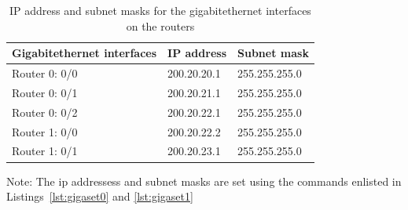 \documentclass{lab_sheet}
\newcommand{\setting}[2]{
    \begin{tabular}{C{3cm}C{5cm}C{5cm}}
        \toprule
          #1 & IP address & Subnet mask\\
          \midrule
          #2
          \bottomrule
       \end{tabular}
}
\newcommand{\customcaption}[2]{
    \begin{mdframed}[backgroundcolor=bg,innerbottommargin=-2.5em]
        
          \end{mdframed}
}
\begin{document}
    \begin{table}[H]
        \centering
        \begin{threeparttable}
        \setting{Gigabitethernet interfaces}{
        Router 0: 0/0 & 200.20.20.1  & 255.255.255.0 \\
        Router 0: 0/1 & 200.20.21.1  & 255.255.255.0 \\
        Router 0: 0/2 & 200.20.22.1  & 255.255.255.0 \\
        Router 1: 0/0 & 200.20.22.2  & 255.255.255.0 \\
        Router 1: 0/1 & 200.20.23.1  & 255.255.255.0 \\
        }
        \begin{tablenotes}
            \small
            \item Note: The ip addressess and subnet masks are set using the commands enlisted in Listings~\ref{lst:gigaset0} and \ref{lst:gigaset1}
          \end{tablenotes}
        \caption{IP address and subnet masks for the gigabitethernet interfaces on the routers}
        \label{tbl:gigasettinga}
    \end{threeparttable}
          \end{table}
          
          \customcaption{gigaset0}{Syntax for configuring interfaces on Router 0}
          \customcaption{gigaset1}{Syntax for configuring interfaces on Router 1}
    
\end{document}
